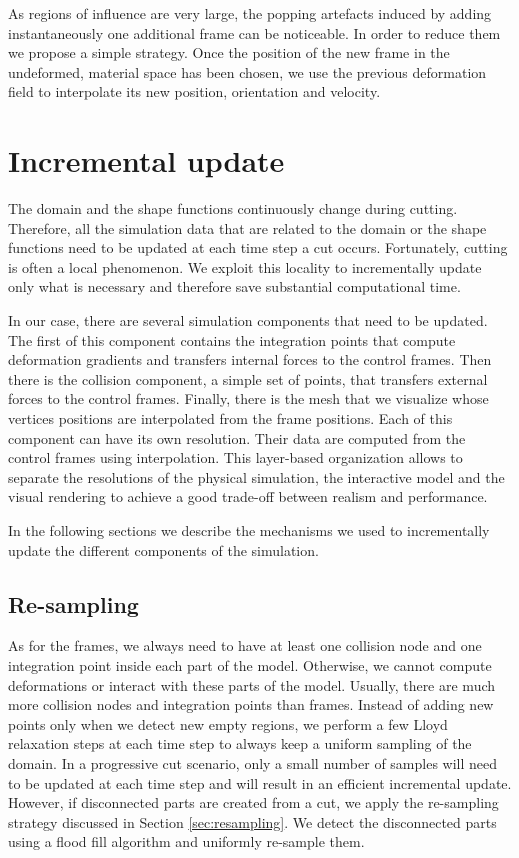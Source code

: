 \documentclass[11pt, oneside, a4paper]{memoir}
\begin{document}
As regions of influence are very large, the popping artefacts induced by adding instantaneously one additional frame can be noticeable. In order to reduce them we propose a simple strategy. Once the position of the new frame in the undeformed, material space has been chosen, we use the previous deformation field to interpolate its new position, orientation and velocity.

\section{Incremental update} \label{sec:incremental}

The domain and the shape functions continuously change during cutting. Therefore, all the simulation data that are related to the domain or the shape functions need to be updated at each time step a cut occurs. Fortunately, cutting is often a local phenomenon. We exploit this locality to incrementally update only what is necessary and therefore save substantial computational time.

In our case, there are several simulation components that need to be updated. The first of this component contains the integration points that compute deformation gradients and transfers internal forces to the control frames. Then there is the collision component, a simple set of points, that transfers external forces to the control frames. Finally, there is the mesh that we visualize whose vertices positions are interpolated from the frame positions. Each of this component can have its own resolution. Their data are computed from the control frames using interpolation. This layer-based organization allows to separate the resolutions of the physical simulation, the interactive model and the visual rendering to achieve a good trade-off between realism and performance.

In the following sections we describe the mechanisms we used to incrementally update the different components of the simulation.

\subsection{Re-sampling}
\label{sec:all_resampling}
As for the frames, we always need to have at least one collision node and one integration point inside each part of the model. Otherwise, we cannot compute deformations or interact with these parts of the model. Usually, there are much more collision nodes and integration points than frames. Instead of adding new points only when we detect new empty regions, we perform a few Lloyd relaxation steps at each time step to always keep a uniform sampling of the domain. In a progressive cut scenario, only a small number of samples will need to be updated at each time step and will result in an efficient incremental update. However, if disconnected parts are created from a cut, we apply the re-sampling strategy discussed in Section \ref{sec:resampling}. We detect the disconnected parts using a flood fill algorithm and uniformly re-sample them.
\end{document}
